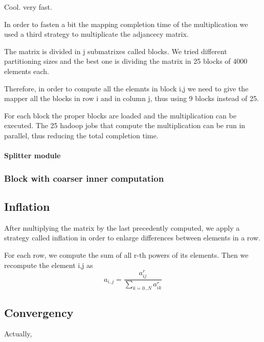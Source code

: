 Cool. very fast.

In order to fasten a bit the mapping completion time of the multiplication
we used a third strategy to multiplicate the adjancecy matrix.

The matrix is divided in j submatrixes called blocks. We tried different partitioning
sizes and the best one is dividing the matrix in 25 blocks of 4000 elements each.

Therefore, in order to compute all the elemnts in block i,j we need to give the mapper
all the blocks in row i  and in column j, thus using 9 blocks instead of 25.

For each block the proper blocks are loaded and the multiplication can be executed.
The 25 hadoop jobs that compute the multiplication can be run in parallel, thus
reducing the total completion time.

\paragraph{Splitter module}

\subsubsection{Block with coarser inner computation}

\subsection{Inflation}

After multiplying the matrix by the last precedently computed, we apply a strategy
called inflation in order to enlarge differences between elements in a row.

For each row, we compute the sum of all r-th powers of its elements.
Then we recompute the element i,j as
$$ a_{i,j} = \frac{a_{ij}^r} {\sum_{k=0..N} a_{ik}^r}$$


\subsection{Convergency}

Actually, 